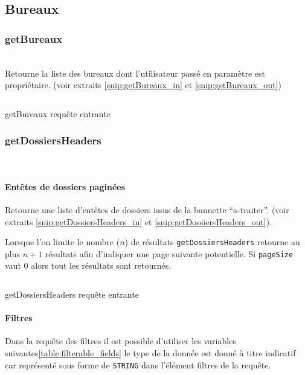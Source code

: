 \subsection{Bureaux}

\subsubsection{getBureaux}
\\

Retourne la liste des bureaux dont l'utilisateur passé en paramètre est propriétaire. (voir extraits \ref{snip:getBureaux_in} et \ref{snip:getBureaux_out}) 

\begin{codesnippet}
\inputminted[frame=single,linenos,fontsize=\footnotesize]{javascript}{extraits/getBureaux_in.js}
\caption{getBureaux requête entrante}
\label{snip:getBureaux_in}
\end{codesnippet}

\subsubsection{getDossiersHeaders}
\\

\paragraph{Entêtes de dossiers paginées}

Retourne une liste d'entêtes de dossiers issus de la bannette ``a-traiter''. (voir extraits \ref{snip:getDossiersHeaders_in} et \ref{snip:getDossiersHeaders_out}).

Lorsque l'on limite le nombre ($n$) de résultats \verb|getDossiersHeaders| retourne au plus $n + 1$ résultats afin d'indiquer une page suivante potentielle. Si \verb|pageSize| vaut 0 alors tout les résultats sont retournés.

\begin{codesnippet}
\inputminted[frame=single,linenos,fontsize=\footnotesize]{javascript}{extraits/getDossiersHeaders_in.js}
\caption{getDossiersHeaders requête entrante}
\label{snip:getDossiersHeaders_in}
\end{codesnippet}

\paragraph{Filtres}
Dans la requête des filtres il est possible d'utiliser les variables suivantes\ref{table:filterable_fields} le type de la donnée est donné à titre indicatif car représenté sous forme de \verb|STRING| dans l'élément filtres de la requête.


